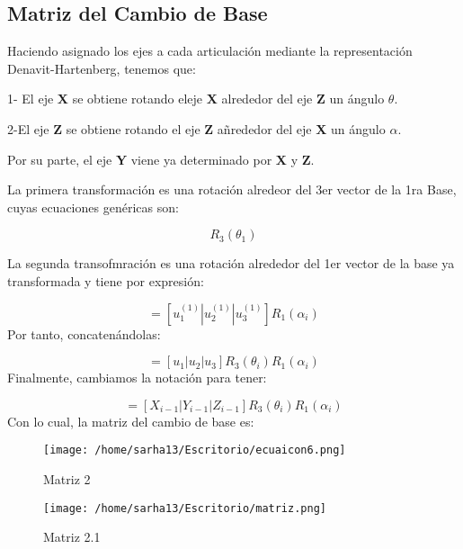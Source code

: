 \documentclass[letter,openright,12pt,spanish]{report}
\begin{document}
\subsection{Matriz del Cambio de Base}

Haciendo asignado los ejes a cada articulaci\'on mediante la representaci\'on Denavit-Hartenberg, tenemos que:

1- El eje \textbf{X} se obtiene rotando eleje \textbf{X} alrededor del eje \textbf{Z} un \'angulo $\theta$.

2-El eje \textbf{Z} se obtiene rotando el eje \textbf{Z} añrededor del eje \textbf{X} un \'angulo \textbf{$\alpha$}.

Por su parte, el eje \textbf{Y} viene ya determinado por \textbf{X} y \textbf{Z}.

La primera transformaci\'on es una rotaci\'on alredeor del 3er vector de la 1ra Base, cuyas ecuaciones gen\'ericas son:

\begin{displaymath}
[u_1^{(1)}|u_2^{(1)}|u_3^{(1)}=[u_1|u_2|u_3]R_3(\theta_1)
\end{displaymath}

La segunda transofmraci\'on es una rotaci\'on alrededor del 1er vector de la base ya transformada y tiene por expresi\'on:

\begin{displaymath}
[u_1^{(2)}|u_2^{(2)}|u_3^{(2)}]=[u_1^{(1)}|u_2^{(1)}|u_3^{(1)}]R_1(\alpha_i)
\end{displaymath}
Por tanto, concaten\'andolas:

\begin{displaymath}
[u_1^{(2)}|u_2^{(2)}|u_3^{(2)}]=[u_1|u_2|u_3]R_3(\theta_i)R_1(\alpha_i)
\end{displaymath}
Finalmente, cambiamos la notaci\'on para tener:

\begin{displaymath}
[X_i|Y_i|Z_i]=[X_{i-1}|Y_{i-1}|Z_{i-1}]R_3(\theta_i)R_1(\alpha_i)
\end{displaymath}
Con lo cual, la matriz del cambio de base es:

\begin{figure}[htp]
\centering
\texttt{[image: /home/sarha13/Escritorio/ecuaicon6.png]}
\caption{Matriz 2}
\label{}
\end{figure}

\begin{figure}[htp]
\centering
\texttt{[image: /home/sarha13/Escritorio/matriz.png]}
\caption{Matriz 2.1}
\label{}
\end{figure}
\end{document}
